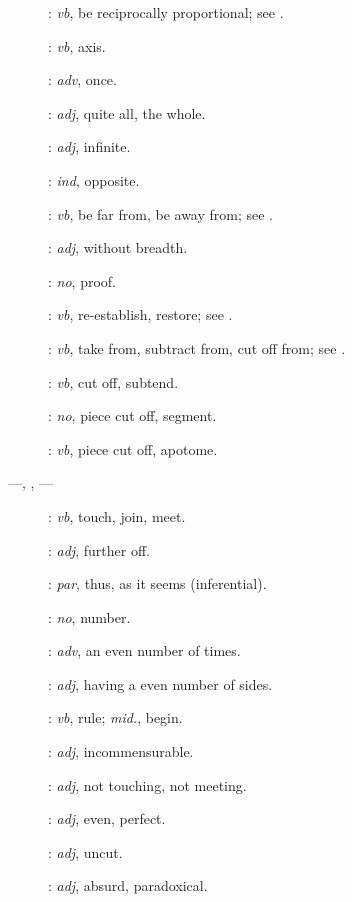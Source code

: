 {\begin{description}
\item[]: {\em vb}, be reciprocally proportional; see .
\item []: {\em vb}, axis.
\item[]: {\em adv}, once.
\item[]: {\em adj}, quite all, the whole.
\item[]: {\em adj}, infinite.
\item[]: {\em ind}, opposite.
\item[]: {\em vb}, be far from, be away from; see .
\item[]: {\em adj}, without breadth.
\item[]: {\em no}, proof.
\item[]: {\em vb}, re-establish, restore; see .
\item[]: {\em vb}, take from, subtract from, cut off from; see .
\item[]: {\em vb}, cut off, subtend.
\item[]: {\em no}, piece cut off, segment.
\item[]: {\em vb}, piece cut off, apotome.
\item[ ---, , ---]: {\em vb},  touch, join, meet.
\item[]: {\em adj}, further off.
\item[]: {\em par}, thus, as it seems (inferential).
\item []: {\em no}, number.
\item[]: {\em adv}, an even number of times.
\item[]: {\em adj}, having a even number of sides.
\item[]: {\em vb},
rule; {\em mid.}, begin.
\item[]: {\em adj}, incommensurable.
\item[]: {\em adj}, not touching, not meeting.
\item[]: {\em adj}, even, perfect.
\item[]: {\em adj}, uncut.
\item[]: {\em adj}, absurd, paradoxical.

\end{description}}
